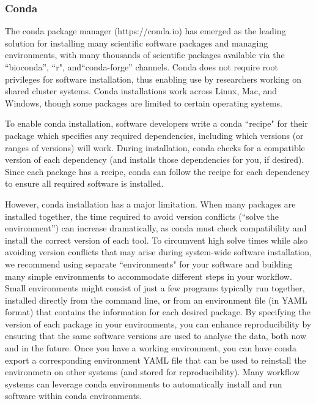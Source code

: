 \documentclass[10pt,letterpaper]{article}
\begin{document}
\begin{greybox}{\subsubsection*{Conda}

The conda package manager (https://conda.io) has emerged as the leading solution for installing many scientific software packages and managing environments, with many thousands of scientific packages available via the ``bioconda”, ``r", and``conda-forge” channels.
Conda does not require root privileges for software installation, thus enabling use by researchers working on shared cluster systems. 
Conda installations work across Linux, Mac, and Windows, though some packages are limited to certain operating systems.

To enable conda installation, software developers write a conda ``recipe" for their package which specifies any required dependencies, including which versions (or ranges of versions) will work.
During installation, conda checks for a compatible version of each dependency (and installs those dependencies for you, if desired). 
Since each package has a recipe, conda can follow the recipe for each dependency to ensure all required software is installed.

However, conda installation has a major limitation. 
When many packages are installed together, the time required to avoid version conflicts (``solve the environment”) can increase dramatically, as conda must check compatibility and install the correct version of each tool. 
To circumvent high solve times while also avoiding version conflicts that may arise during system-wide software installation, we recommend using separate ``environments" for your software and building many simple environments to accommodate different steps in your workflow. 
Small environments might consist of just a few programs typically run together, installed directly from the command line, or from an environment file (in YAML format) that contains the information for each desired package. 
By specifying the version of each package in your environments, you can enhance reproducibility by ensuring that the same software versions are used to analyse the data, both now and in the future.
Once you have a working environment, you can have conda export a corresponding environment YAML file that can be used to reinstall the environmetn on other systems (and stored for reproducibility). Many workflow systems can leverage conda environments to automatically install and run software within conda environments.

}
\end{greybox}
\end{document}
